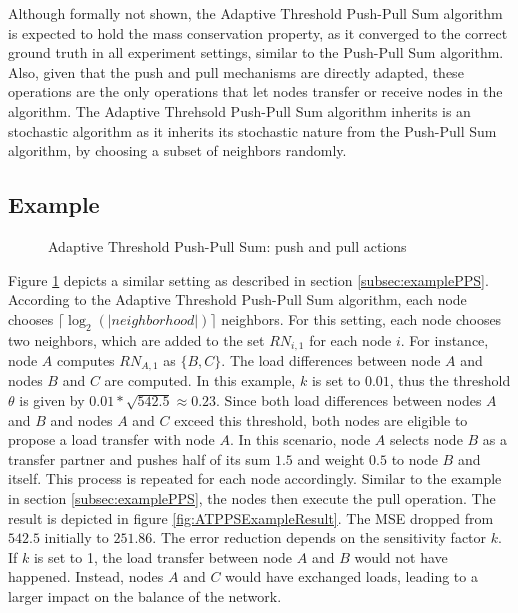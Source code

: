 Although formally not shown, the Adaptive Threshold Push-Pull Sum algorithm is expected to hold the mass conservation property, as it converged to the correct ground truth in all experiment settings, similar to the Push-Pull Sum algorithm. Also, given that the push and pull mechanisms are directly adapted, these operations are the only operations that let nodes transfer or receive nodes in the algorithm. The Adaptive Threhsold Push-Pull Sum algorithm inherits is an stochastic algorithm as it inherits its stochastic nature from the Push-Pull Sum algorithm, by choosing a subset of neighbors randomly.



\subsection{Example}\label{subsec:exampleAdaptiveThresholdPPS}
\begin{figure}
    \centering
    \scalebox{0.75}{}
    \caption{Adaptive Threshold Push-Pull Sum: push and pull actions}
    \label{fig:ATPPSExampleSetting}
\end{figure}

Figure \ref{fig:ATPPSExampleSetting} depicts a similar setting as described in section \ref{subsec:examplePPS}. According to the Adaptive Threshold Push-Pull Sum algorithm, each node chooses $\lceil \log_{2}{(|neighborhood|)} \rceil$ neighbors. For this setting, each node chooses two neighbors, which are added to the set $RN_{i,1}$ for each node $i$. For instance, node $A$ computes $RN_{A,1}$ as $\{B,C\}$. The load differences between node $A$ and nodes $B$ and $C$ are computed. In this example, $k$ is set to $0.01$, thus the threshold $\theta$ is given by $0.01*\sqrt{542.5} \approx 0.23$. Since both load differences between nodes $A$ and $B$ and nodes $A$ and $C$ exceed this threshold, both nodes are eligible to propose a load transfer with node $A$. In this scenario, node $A$ selects node $B$ as a transfer partner and pushes half of its sum $1.5$ and weight $0.5$ to node $B$ and itself. This process is repeated for each node accordingly. Similar to the example in section \ref{subsec:examplePPS}, the nodes then execute the pull operation. The result is depicted in figure \ref{fig:ATPPSExampleResult}. The MSE dropped from $542.5$ initially to $251.86$. The error reduction depends on the sensitivity factor $k$. If $k$ is set to 1, the load transfer between node $A$ and $B$ would not have happened. Instead, nodes $A$ and $C$ would have exchanged loads, leading to a larger impact on the balance of the network. 

